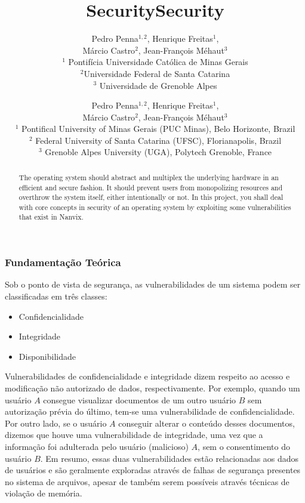 \documentclass[11pt]{article}
\title{Security}
\author{
	Pedro Penna$^{1,2}$, Henrique Freitas$^{1}$,\\
	Márcio Castro$^{2}$, Jean-François Méhaut$^{3}$\\[0.3em]
	\small $^{1}$ Pontifícia Universidade Católica de Minas Gerais\\
	\small $^{2}$Universidade Federal de Santa Catarina\\
	\small $^{3}$ Universidade de Grenoble Alpes
}
\date{}
\title{Security}
\author {
	Pedro Penna$^{1,2}$, Henrique Freitas$^{1}$,\\
	Márcio Castro$^{2}$, Jean-François Méhaut$^{3}$\\[0.3em]
	\small $^{1}$ Pontifical University of Minas Gerais (PUC Minas), Belo Horizonte, Brazil\\
	\small $^{2}$ Federal University of Santa Catarina (UFSC), Florianapolis, Brazil\\
	\small $^{3}$ Grenoble Alpes University (UGA), Polytech Grenoble, France}
\date {}
\newif\ifbr
\newif\ifen
\begin{document}
\maketitle

\begin{abstract}
\ifbr
	\noindent Além de prover uma abstração do hardware de maneira
	eficiente e robusta, o sistema operacional deve fazer isso de forma
	segura, certificando que nenhum usuário monopolize recursos, derrube
	o sistema e nem acesse informações sem autorização necessária, seja
	isso intencional ou não. Nesse projeto, você lidará com aspectos
	relacionados à segurança de um sistema operacional explorando
	vulnerabilidades presentes no Nanvix.
\else\ifen
	\noindent The operating system should abstract and multiplex the
	underlying hardware in an efficient and secure fashion. It should
	prevent users from monopolizing resources and overthrow the system
	itself, either intentionally or not. In this project, you shall deal
	with core concepts in security of an operating system by exploiting
	some vulnerabilities that exist in Nanvix.
\fi\fi

\end{abstract}

\ifbr
\subsubsection*{Fundamentação Teórica}

Sob o ponto de vista de segurança, as vulnerabilidades de um sistema
podem ser classificadas em três classes:

\begin{itemize}
	\item Confidencialidade
	\item Integridade
	\item Disponibilidade
\end{itemize}

Vulnerabilidades de confidencialidade e integridade dizem respeito ao
acesso e modificação não autorizado de dados, respectivamente. Por
exemplo, quando um usuário $A$ consegue visualizar documentos de um
outro usuário $B$ sem autorização prévia do último, tem-se uma
vulnerabilidade de confidencialidade. Por outro lado, se o usuário $A$
conseguir alterar o conteúdo desses documentos, dizemos que houve uma
vulnerabilidade de integridade, uma vez que a informação foi adulterada
pelo usuário (malicioso) $A$, sem o consentimento do usuário $B$. Em
resumo, essas duas vulnerabilidades estão relacionadas aos dados de
usuários e são geralmente exploradas através de falhas de segurança
presentes no sistema de arquivos, apesar de também serem possíveis
através técnicas de violação de memória.
\end{document}
